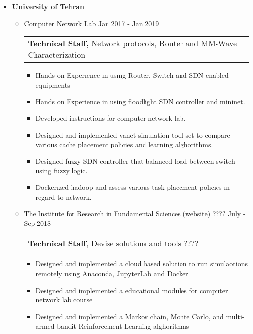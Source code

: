 \documentclass[a4paper,10pt]{article} %
\begin{document}
\begin{itemize}
	 \item \textbf{University of Tehran} 
	 \begin{itemize}
	 	\item 
	 	\textcolor{blue(ryb)}{Computer Network Lab} \hfill Jan 2017 - Jan 2019\\
	 	\begin{tabular}{ll}
	 		{\bf Technical Staff, } Network protocols, Router and MM-Wave Characterization & \\
	 	\end{tabular}
	 	\begin{itemize}
	 		\item Hands on Experience in using Router, Switch and SDN enabled equipments
	 		\item Hands on Experience in using floodlight SDN controller and mininet.
	 		\item Developed instructions for computer network lab.
	 		\item Designed and implemented vanet simulation tool set to compare various cache placement policies and learning alghorithms.
	 		\item Designed fuzzy SDN controller that balanced load between switch using fuzzy logic.
	 		\item Dockerized hadoop and assess various task placement policies in regard to network.\\
	 	\end{itemize}
	 		
	 	\item 
	 	\textcolor{blue(ryb)}{The Institute for Research in Fundamental Sciences} \href{http://cs.ipm.ac.ir}{(website)} ???? \hfill July - Sep 2018 \\
	 	\begin{tabular}{lr}
	 		{\bf Technical Staff}, Devise solutions and tools ????& \\
	 	\end{tabular}
	 	\begin{itemize}
	 		\item
	 		Designed and implemented a cloud based solution to run simulaotions remotely using Anaconda, JupyterLab and Docker
	 		\item
	 		Designed and implemented a educational modules for computer network lab course 
	 		\item
	 		Designed and implemented a Markov chain, Monte Carlo, and multi-armed bandit Reinforcement Learning alghorithms  \\
	 	\end{itemize}
	 	
	 \end{itemize}
\end{itemize}
\end{document}
